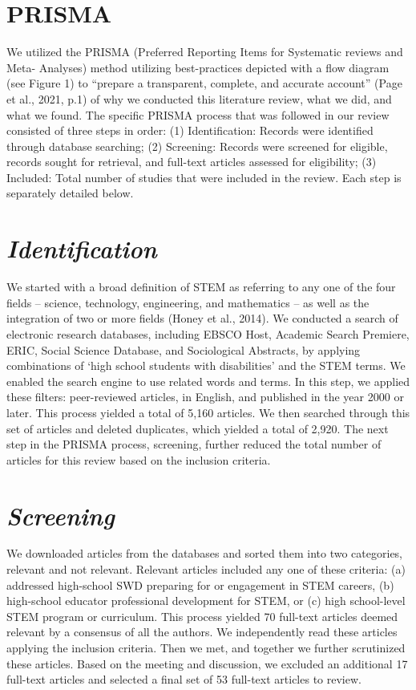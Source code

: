 \documentclass[11pt]{sig-alternate}
\begin{document}
\begin{large}
\section*{PRISMA}
We utilized the PRISMA (Preferred Reporting Items for Systematic reviews and Meta- Analyses) method utilizing best-practices depicted with a flow diagram (see Figure 1) to “prepare a transparent, complete, and accurate account” (Page et al., 2021, p.1) of why we conducted this literature review, what we did, and what we found. The specific PRISMA process that was  followed in our review consisted of three steps in order: (1) Identification: Records were identified through database searching; (2) Screening: Records were screened for eligible, records sought for retrieval, and full-text articles assessed for eligibility; (3) Included: Total number of studies that were included in the review. Each step is separately detailed below.  

\section*{\textit{Identification}}
 
We started with a broad definition of STEM as referring to any one of the four fields – science, technology, engineering, and mathematics – as well as the integration of two or more fields (Honey et al., 2014). We conducted a search of electronic research databases, including EBSCO Host, Academic Search Premiere, ERIC, Social Science Database, and Sociological Abstracts, by applying combinations of ‘high school students with disabilities’ and the STEM terms. We enabled the search engine to use related words and terms. In this step, we applied these filters: peer-reviewed articles, in English, and published in the year 2000 or later. This process yielded a total of 5,160 articles. We then searched through this set of articles and deleted duplicates, which yielded a total of 2,920. The next step in the PRISMA process, screening, further reduced the total number of articles for this review based on the inclusion criteria.  

\section*{\textit{Screening}}

We downloaded articles from the databases and sorted them into two categories, relevant and not relevant. Relevant articles included any one of these criteria: (a) addressed high-school SWD preparing for or engagement in STEM careers, (b) high-school educator professional development for STEM, or (c) high school-level STEM program or curriculum. This process yielded 70 full-text articles deemed relevant by a consensus of all the authors. We independently read these articles applying the inclusion criteria. Then we met, and together we further scrutinized these articles. Based on the meeting and discussion, we excluded an additional 17 full-text articles and selected a final set of 53 full-text articles to review.


\end{large}
\end{document}
